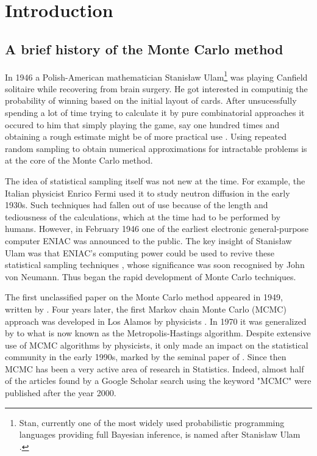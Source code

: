 \documentclass[report.tex]{subfiles}
\begin{document}
\chapter{Introduction}

\section{A brief history of the Monte Carlo method}

In 1946 a Polish-American mathematician Stanisław Ulam\footnote{
  Stan, currently one of the most widely used probabilistic programming languages
  providing full Bayesian inference, is named after Stanisław Ulam
  \cite{stanReferenceManual}.
}
was playing Canfield solitaire while recovering from brain surgery.
He got interested in computinig the probability of winning based on the initial
layout of cards. After unsucessfully spending a lot of time trying to calculate it
by pure combinatorial approaches it occured to him that simply playing the
game, say one hundred times and obtaining a rough estimate might be of more
practical use \cite{eckhardt1987stan}. Using repeated random sampling
to obtain numerical approximations for intractable problems is at the
core of the Monte Carlo method.

The idea of statistical sampling itself was not new at the time. For example,
the Italian physicist Enrico Fermi used it to study neutron diffusion in the
early 1930s. Such techniques had fallen out of use because of the
length and tediousness of the calculations, which at the time had to be
performed by humans. However, in February 1946 one of the earliest electronic
general-purpose computer ENIAC was announced to the public. The key insight of
Stanisław Ulam was that ENIAC's computing power could be used to revive these
statistical sampling techniques \cite{metropolis1987beginning}, whose significance
was soon recognised by John von Neumann. Thus began the rapid development of
Monte Carlo techniques.

The first unclassified paper on the Monte Carlo method appeared in 1949, written
by \citet{metropolis1949monte}. Four years later, the first Markov chain Monte Carlo
(MCMC) approach was developed in Los Alamos by physicists \citet{metropolis1953equation}.
In 1970 it was generalized by \citet{hastings1970monte} to what is now
known as the Metropolis-Hastings algorithm. Despite extensive
use of MCMC algorithms by physicists, it only made an impact on the statistical
community in the early 1990s, marked by the seminal paper of
\citet{gelfand1990sampling}. Since then MCMC has been a very active area of
research in Statistics. Indeed, almost half of the articles found by a
Google Scholar search using the keyword "MCMC" were published after the year 2000.
\end{document}
